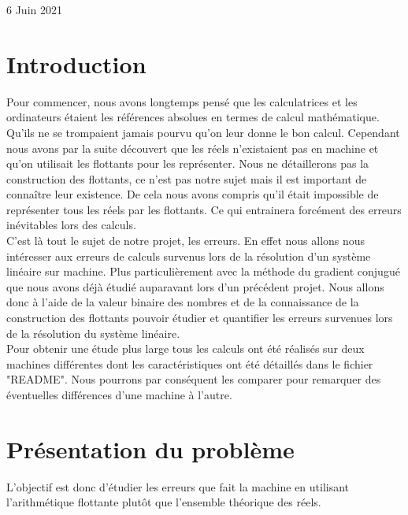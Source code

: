 \documentclass[12,french]{report}
\begin{document}
\begin{titlepage}
\begin{center}
	\vfill
	{\large 6 Juin 2021}
\end{center}
\end{titlepage}

\tableofcontents


\renewcommand{\chaptername}{}
\chapter*{Introduction} %
Pour commencer, nous avons longtemps pensé que les calculatrices et les ordinateurs étaient les références absolues en termes de calcul mathématique. Qu'ils ne se trompaient jamais pourvu qu'on leur donne le bon calcul. Cependant nous avons par la suite découvert que les réels n'existaient pas en machine et qu'on utilisait les flottants pour les représenter. Nous ne détaillerons pas la construction des flottants, ce n'est pas notre sujet mais il est important de connaître leur existence. De cela nous avons compris qu'il était impossible de représenter tous les réels par les flottants. Ce qui entrainera forcément des erreurs inévitables lors des calculs. \\

C'est là tout le sujet de notre projet, les erreurs. En effet nous allons nous intéresser aux erreurs de calculs survenus lors de la résolution d'un système linéaire sur machine. Plus particulièrement avec la méthode du gradient conjugué que nous avons déjà étudié auparavant lors d'un précédent projet. Nous allons donc à l'aide de la valeur binaire des nombres et de la connaissance de la construction des flottants pouvoir étudier et quantifier les erreurs survenues lors de la résolution du système linéaire. \\

Pour obtenir une étude plus large tous les calculs ont été réalisés sur deux machines différentes dont les caractéristiques ont été détaillés dans le fichier "README". Nous pourrons par conséquent les comparer pour remarquer des éventuelles différences d'une machine à l'autre.

\chapter{Présentation du problème} %

L'objectif est donc d'étudier les erreurs que fait la machine en utilisant l'arithmétique flottante plutôt que l'ensemble théorique des réels.\\
\end{document}
